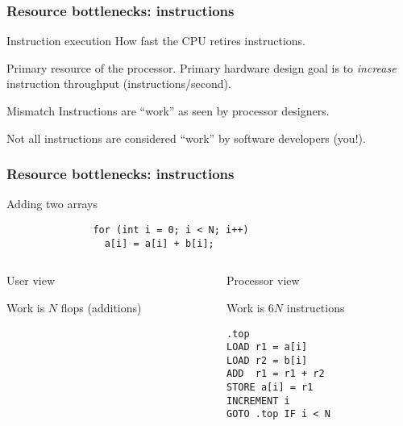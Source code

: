 \documentclass[presentation,aspectratio=43,10pt]{beamer}
\begin{document}
\begin{frame}
  \frametitle{Resource bottlenecks: instructions}
  \begin{block}{Instruction execution}
    How fast the CPU retires instructions.

    Primary resource of the processor. Primary hardware design goal is to
    \emph{increase} instruction throughput (instructions/second).
  \end{block}
  \begin{challenge}{Mismatch}
    Instructions are ``work'' as seen by processor designers.

    Not all instructions are considered ``work'' by software
    developers (you!).
  \end{challenge}
\end{frame}
\begin{frame}[fragile]
  \frametitle{Resource bottlenecks: instructions}
  \begin{exampleblock}{Adding two arrays}
\begin{verbatim}
               for (int i = 0; i < N; i++)
                 a[i] = a[i] + b[i];
\end{verbatim}
    \begin{columns}[t]
      \begin{column}{0.45\textwidth}
        User view

        Work is $N$ flops (additions)
      \end{column}
      \begin{column}{0.45\textwidth}
        Processor view

        Work is $6N$ instructions
\begin{verbatim}
.top
LOAD r1 = a[i]
LOAD r2 = b[i]
ADD  r1 = r1 + r2
STORE a[i] = r1
INCREMENT i
GOTO .top IF i < N 
\end{verbatim}
      \end{column}
    \end{columns}
  \end{exampleblock}
\end{frame}
\end{document}
